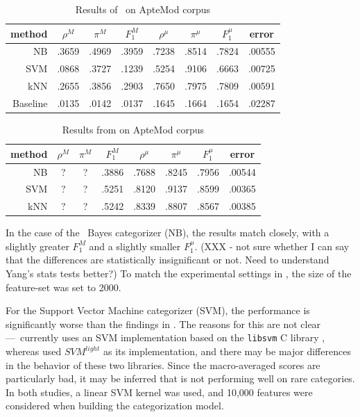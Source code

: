 \begin{table}
\begin{center}
\begin{tabular}{|r c c c c c c c|}
\hline
method    & $\rho^M$ & $\pi^M$ & $F_1^M$ & $\rho^\mu$ & $\pi^\mu$ & $F_1^\mu$ &   error \\
\hline
NB        &   .3659  &  .4969  &  .3959  &  .7238     &  .8514    &  .7824    &  .00555 \\
SVM       &   .0868  &  .3727  &  .1239  &  .5254     &  .9106    &  .6663    &  .00725 \\
kNN       &   .2655  &  .3856  &  .2903  &  .7650     &  .7975    &  .7809    &  .00591 \\
Baseline  &   .0135  &  .0142  &  .0137  &  .1645     &  .1664    &  .1654    &  .02287 \\
\hline
\end{tabular}
\end{center}
\caption{Results of \aicat\ on ApteMod corpus}
\label{aptemod-results}
\end{table}

\begin{table}
\begin{center}
\begin{tabular}{|r c c c c c c c|}
\hline
method & $\rho^M$ & $\pi^M$ & $F_1^M$ & $\rho^\mu$ & $\pi^\mu$ & $F_1^\mu$ & error \\
\hline
NB  & ? & ? & .3886 & .7688 & .8245 & .7956 & .00544 \\
SVM & ? & ? & .5251 & .8120 & .9137 & .8599 & .00365 \\
kNN & ? & ? & .5242 & .8339 & .8807 & .8567 & .00385 \\
\hline
\end{tabular}
\end{center}
\caption{Results from \cite{yang:99} on ApteMod corpus}
\label{aptemod-yang}
\end{table}

In the case of the \naive\ Bayes categorizer (NB), the results match
\cite{yang:99} closely, with a slightly greater $F_1^M$ and a slightly
smaller $F_1^\mu$. (XXX - not sure whether I can say that the
differences are statistically insignificant or not.  Need to
understand Yang's stats tests better?)  To match the experimental
settings in \cite{yang:99}, the size of the feature-set was set to
2000.

For the Support Vector Machine categorizer (SVM), the performance is
significantly worse than the findings in \cite{yang:99}.  The reasons
for this are not clear---\aicat\ currently uses an SVM implementation
based on the \texttt{libsvm} C library \cite{libsvm}, whereas
\cite{yang:99} used $SVM^{light}$ as its
implementation\cite{joachims:99a}, and there may be major differences
in the behavior of these two libraries.  Since the macro-averaged scores are
particularly bad, it may be inferred that \cite{libsvm} is not
performing well on rare categories.  In both studies, a linear SVM
kernel was used, and 10,000 features were considered when building the
categorization model.

